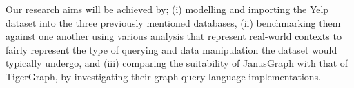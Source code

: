 Our research aims will be achieved by; (i) modelling and importing the Yelp dataset into the three previously mentioned databases, (ii) benchmarking them against one another using various analysis that represent real-world contexts to fairly represent the type of querying and data manipulation the dataset would typically undergo, and (iii) comparing the suitability of JanusGraph with that of TigerGraph, by investigating their graph query language implementations.
